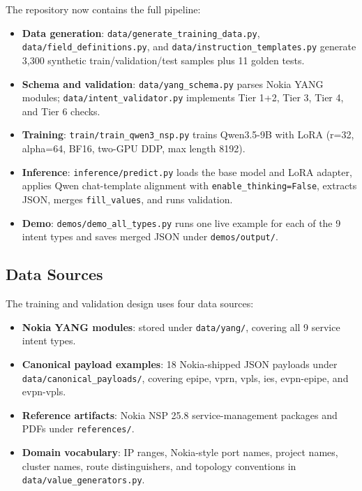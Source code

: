 \documentclass[12pt, a4paper]{article}
\newcommand{\filepath}[1]{\texttt{#1}}
\newcommand{\yang}{\textsc{YANG}}
\newcommand{\fillvalues}{\texttt{fill\_values}}
\begin{document}
The repository now contains the full pipeline:

\begin{itemize}
  \item \textbf{Data generation}: \filepath{data/generate\_training\_data.py}, \filepath{data/field\_definitions.py}, and \filepath{data/instruction\_templates.py} generate 3,300 synthetic train/validation/test samples plus 11 golden tests.
  \item \textbf{Schema and validation}: \filepath{data/yang\_schema.py} parses Nokia \yang{} modules; \filepath{data/intent\_validator.py} implements Tier 1+2, Tier 3, Tier 4, and Tier 6 checks.
  \item \textbf{Training}: \filepath{train/train\_qwen3\_nsp.py} trains Qwen3.5-9B with LoRA (r=32, alpha=64, BF16, two-GPU DDP, max length 8192).
  \item \textbf{Inference}: \filepath{inference/predict.py} loads the base model and LoRA adapter, applies Qwen chat-template alignment with \texttt{enable\_thinking=False}, extracts JSON, merges \fillvalues{}, and runs validation.
  \item \textbf{Demo}: \filepath{demos/demo\_all\_types.py} runs one live example for each of the 9 intent types and saves merged JSON under \filepath{demos/output/}.
\end{itemize}

\subsection{Data Sources}

The training and validation design uses four data sources:

\begin{itemize}
  \item \textbf{Nokia \yang{} modules}: stored under \filepath{data/yang/}, covering all 9 service intent types.
  \item \textbf{Canonical payload examples}: 18 Nokia-shipped JSON payloads under \filepath{data/canonical\_payloads/}, covering epipe, vprn, vpls, ies, evpn-epipe, and evpn-vpls.
  \item \textbf{Reference artifacts}: Nokia NSP 25.8 service-management packages and PDFs under \filepath{references/}.
  \item \textbf{Domain vocabulary}: IP ranges, Nokia-style port names, project names, cluster names, route distinguishers, and topology conventions in \filepath{data/value\_generators.py}.
\end{itemize}
\end{document}
